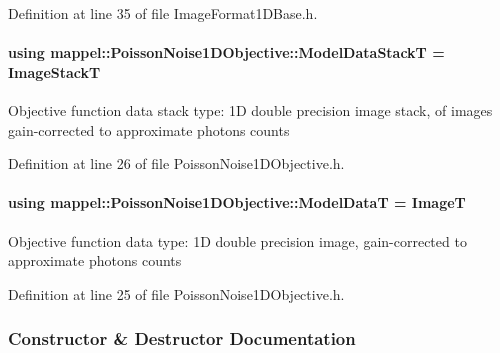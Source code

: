 Definition at line 35 of file Image\+Format1\+D\+Base.\+h.

\paragraph[{\texorpdfstring{Model\+Data\+StackT}{ModelDataStackT}}]{\setlength{\rightskip}{0pt plus 5cm}using {\bf mappel\+::\+Poisson\+Noise1\+D\+Objective\+::\+Model\+Data\+StackT} =  {\bf Image\+StackT}}\hypertarget{classmappel_1_1PoissonNoise1DObjective_a62f5cb009e4c0e53fdfbf90b3153b94f}{}\label{classmappel_1_1PoissonNoise1DObjective_a62f5cb009e4c0e53fdfbf90b3153b94f}
Objective function data stack type\+: 1D double precision image stack, of images gain-\/corrected to approximate photons counts 

Definition at line 26 of file Poisson\+Noise1\+D\+Objective.\+h.

\paragraph[{\texorpdfstring{Model\+DataT}{ModelDataT}}]{\setlength{\rightskip}{0pt plus 5cm}using {\bf mappel\+::\+Poisson\+Noise1\+D\+Objective\+::\+Model\+DataT} =  {\bf ImageT}}\hypertarget{classmappel_1_1PoissonNoise1DObjective_a0f72eebcb9fb785a5489fc5489bff9b0}{}\label{classmappel_1_1PoissonNoise1DObjective_a0f72eebcb9fb785a5489fc5489bff9b0}
Objective function data type\+: 1D double precision image, gain-\/corrected to approximate photons counts 

Definition at line 25 of file Poisson\+Noise1\+D\+Objective.\+h.



\subsubsection{Constructor \& Destructor Documentation}

